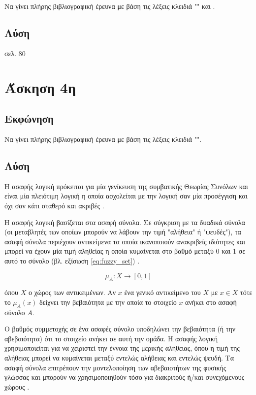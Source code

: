 \documentclass{assignment}
\begin{document}
Να γίνει πλήρης βιβλιογραφική έρευνα με βάση τις λέξεις κλειδιά "" και .

\subsection {Λύση}

σελ. 80

\section{Άσκηση 4η}
\subsection{Εκφώνηση}

Να γίνει πλήρης βιβλιογραφική έρευνα με βάση τις λέξεις κλειδιά "".

\subsection {Λύση}

Η ασαφής λογική πρόκειται για μία γενίκευση της συμβατικής Θεωρίας Συνόλων και είναι μία πλειότιμη λογική η οποία ασχολείται με την λογική σαν μία προσέγγιση και όχι σαν κάτι σταθερό και ακριβές \cite{engelbrecht,class_notes,wiki:fuzzy_logic,zadeh1994}. %

Η ασαφής λογική βασίζεται στα ασαφή σύνολα. Σε σύγκριση με τα δυαδικά σύνολα (οι μεταβλητές των οποίων μπορούν να λάβουν την τιμή "αλήθεια" ή "ψευδές"), τα ασαφή σύνολα περιέχουν αντικείμενα τα οποία ικανοποιούν ανακριβείς ιδιότητες και μπορεί να έχουν μία τιμή αληθείας η οποία κυμαίνεται στο βαθμό μεταξύ 0 και 1 σε αυτό το σύνολο (βλ. εξίσωση \eqref{eq:fuzzy_set}) \cite{zadeh1965338}. 

\begin{equation}
\mu_A : X \rightarrow [0,1]
\label{eq:fuzzy_set}
\end{equation}

όπου $X$ ο χώρος των αντικειμένων. Αν $x$ ένα γενικό αντικείμενο του $X$ με $x \in X$ τότε το $\mu_A(x)$ δείχνει την βεβαιότητα με την οποία το στοιχείο $x$ ανήκει στο ασαφή σύνολο $A$.

Ο βαθμός συμμετοχής σε ένα ασαφές σύνολο υποδηλώνει την βεβαιότητα (ή την αβεβαιότητα) ότι το στοιχείο ανήκει σε αυτή την ομάδα. Η ασαφής λογική χρησιμοποιείται για να χειριστεί την έννοια της μερικής αλήθειας, όπου η τιμή της αλήθειας μπορεί να κυμαίνεται μεταξύ εντελώς αλήθειας και εντελώς ψευδή. Τα ασαφή σύνολα επιτρέπουν την μοντελοποίηση των αβεβαιοτήτων της φυσικής γλώσσας και μπορούν να χρησιμοποιηθούν τόσο για διακριτούς ή/και συνεχόμενους χώρους \cite{engelbrecht,class_notes,wiki:fuzzy_logic}. 
\end{document}
